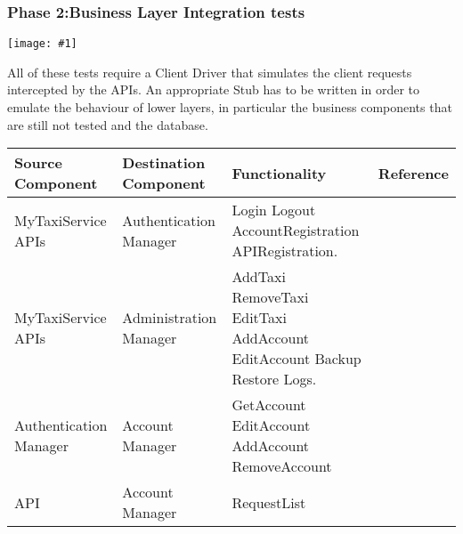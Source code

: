 \documentclass[11pt, a4paper,titlepage]{article}
\newcommand{\image}[1]{
	\begin{center}
		\noindent \texttt{[image: \#1]}
	\end{center}
}
\begin{document}
	\subsubsection{Phase 2:Business Layer Integration tests}
	\image{test_phase2.png}	
	All of these tests require a Client Driver that simulates the client requests intercepted by the APIs. An appropriate Stub has to be written in order to emulate the behaviour of lower layers, in particular the business components that are still not tested and the database.
	\newline
	\newline
	\begin{tabularx}{\textwidth}{| X |X |X |c|}
		\hline \textbf{Source Component} &\textbf{Destination Component}&\textbf{Functionality} & \textbf{Reference} \\
		\hline MyTaxiService APIs & Authentication Manager & 
		Login\newline
		Logout\newline
		AccountRegistration\newline
		APIRegistration.
		&\\
		\hline MyTaxiService APIs & Administration Manager &  
		AddTaxi\newline
		RemoveTaxi\newline
		EditTaxi\newline
		AddAccount\newline
		EditAccount\newline
		Backup\newline
		Restore\newline
		Logs.
		&\\
		\hline Authentication Manager & Account Manager & 
		GetAccount\newline
		EditAccount\newline
		AddAccount\newline
		RemoveAccount\newline
		&\\
			\hline API & Account Manager & 
			RequestList
			&\\
		\hline
	\end{tabularx}
\end{document}

